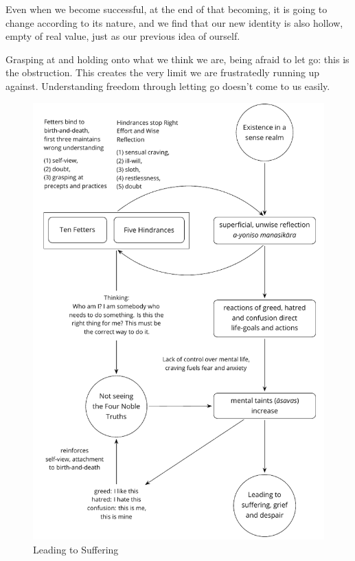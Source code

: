 Even when we become successful, at the end of that becoming, it is going
to change according to its nature, and we find that our new identity is
also hollow, empty of real value, just as our previous idea of ourself.

Grasping at and holding onto what we think we are, being afraid to let
go: this is the obstruction. This creates the very limit we are
frustratedly running up against. Understanding freedom through letting
go doesn't come to us easily.

\cleartoverso
\figurepagelayout

\begin{figure}[h]
\vspace*{-10mm}%
\caption{Leading to Suffering}\label{fig-leading-to-suffering}

\centering

\includegraphics[width=\linewidth-5mm]{./manuscript/tex/diagrams/leading-to-suffering.pdf}

\end{figure}

